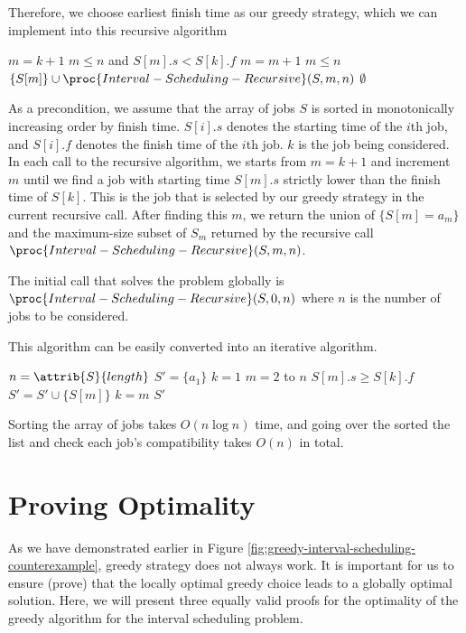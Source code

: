 Therefore, we choose earliest finish time as our greedy strategy, which we can implement into this recursive algorithm

\begin{codebox}
    \li $m = k + 1$
    \li \While $m \leq n$ and $S[m].s < S[k].f$ \Do
        \li $m = m + 1$
    \End
    \li \If $m \leq n$ \Then
        \li \Return $\{S[m]\} \cup \proc{Interval-Scheduling-Recursive}(S,m,n)$
    \li \Else
        \li \Return $\emptyset$ 
\end{codebox}

As a precondition, we assume that the array of jobs $S$ is sorted in monotonically increasing order by finish time. $S[i].s$ denotes the starting time of the $i$th job, and $S[i].f$ denotes the finish time of the $i$th job. $k$ is the job being considered. In each call to the recursive algorithm, we starts from $m = k+1$ and increment $m$ until we find a job with starting time $S[m].s$ strictly lower than the finish time of $S[k]$. This is the job that is selected by our greedy strategy in the current recursive call. After finding this $m$, we return the union of $\{S[m] = a_m\}$ and the maximum-size subset of $S_m$ returned by the recursive call $\proc{Interval-Scheduling-Recursive}(S,m,n)$.

The initial call that solves the problem globally is $\proc{Interval-Scheduling-Recursive}(S,0,n)$ where $n$ is the number of jobs to be considered.

This algorithm can be easily converted into an iterative algorithm.

\begin{codebox}
    \li $n = \attrib{S}{length}$ 
    \li $S' = \{a_1\}$
    \li $k = 1$
    \li \For $m = 2$ to $n$ \Do
        \li \If $S[m].s \geq S[k].f$ \Then
            \li $S' = S' \cup \{S[m]\}$
            \li $k = m$
        \End
    \End
    \li \Return $S'$ 
\end{codebox}

Sorting the array of jobs takes $O(n \log n)$ time, and going over the sorted the list and check each job's compatibility takes $O(n)$ in total.

\section{Proving Optimality}

As we have demonstrated earlier in Figure \ref{fig:greedy-interval-scheduling-counterexample}, greedy strategy does not always work. It is important for us to ensure (prove) that the locally optimal greedy choice leads to a globally optimal solution. Here, we will present three equally valid proofs for the optimality of the greedy algorithm for the interval scheduling problem.

